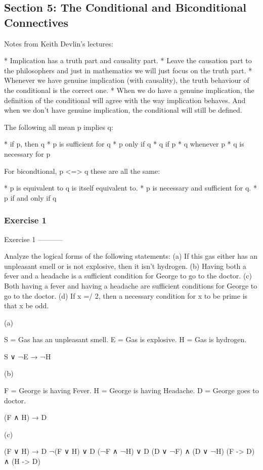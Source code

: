 \subsection{Section 5: The Conditional and Biconditional Connectives}

Notes from Keith Devlin's lectures:

* Implication has a truth part and causality part.
* Leave the causation part to the philosophers and just in mathematics
  we will just focus on the truth part.
* Whenever we have genuine implication (with causality), the truth
  behaviour of the conditional is the correct one.
* When we do have a genuine implication, the definition of the
  conditional will agree with the way implication behaves. And when we
  don't have genuine implication, the conditional will still be
  defined.

The following all mean p implies q:

* if p, then q
* p is sufficient for q
* p only if q
* q if p
* q whenever p
* q is necessary for p

For bicondtional, p <=> q these are all the same:

* p is equivalent to q is itself equivalent to.
* p is necessary and sufficient for q.
* p if and only if q

\subsubsection{Exercise 1}
Exercise 1
-----------

    Analyze the logical forms of the following statements:
    (a) If this gas either has an unpleasant smell or is not explosive, then it
    isn’t hydrogen.
    (b) Having both a fever and a headache is a sufficient condition for George
    to go to the doctor.
    (c) Both having a fever and having a headache are sufficient conditions
    for George to go to the doctor.
    (d) If x =/ 2, then a necessary condition for x to be prime is that
    x be odd.

(a)

S = Gas has an unpleasant smell.
E = Gas is explosive.
H = Gas is hydrogen.

    S ∨ ¬E → ¬H

(b)

F = George is having Fever.
H = George is having Headache.
D = George goes to doctor.

    (F ∧ H) → D

(c)

    (F ∨ H) → D
    ¬(F ∨ H) ∨ D
    (¬F ∧ ¬H) ∨ D
    (D ∨ ¬F) ∧ (D ∨ ¬H)
    (F -> D) ∧ (H -> D)

